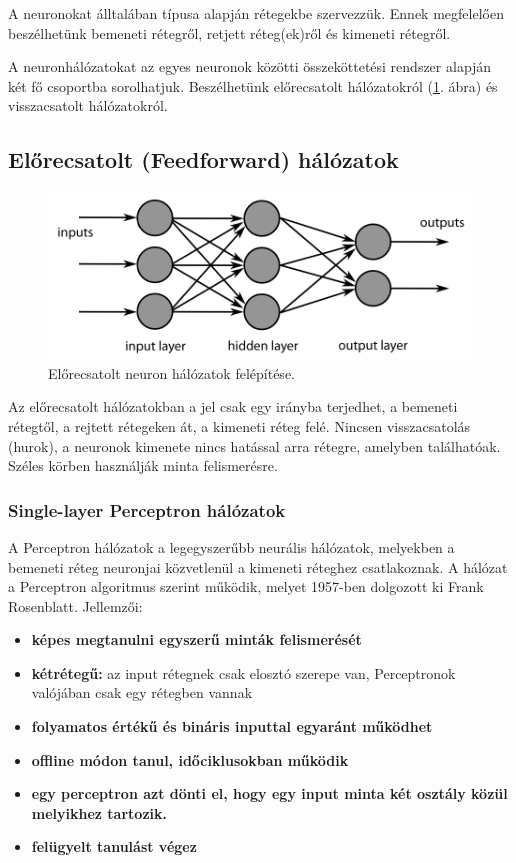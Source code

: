 \documentclass[a4paper]{article}
\begin{document}
A neuronokat álltalában típusa alapján rétegekbe szervezzük. Ennek megfelelően beszélhetünk bemeneti rétegről, retjett réteg(ek)ről és kimeneti rétegről.

A neuronhálózatokat az egyes neuronok közötti összeköttetési rendszer alapján két fő csoportba sorolhatjuk. Beszélhetünk előrecsatolt hálózatokról (\ref{forward_neuron}. ábra) és visszacsatolt hálózatokról. 

\subsection{Előrecsatolt (Feedforward) hálózatok}

\begin{figure}
  \centering
  \includegraphics[scale=0.3]{neuron_layers}
  \caption{Előrecsatolt neuron hálózatok felépítése.}
  \label{forward_neuron}
\end{figure}

Az előrecsatolt hálózatokban a jel csak egy irányba terjedhet, a bemeneti rétegtől, a rejtett rétegeken át,  a kimeneti réteg felé. Nincsen visszacsatolás (hurok), a neuronok kimenete nincs hatással arra rétegre, amelyben találhatóak. Széles körben használják minta felismerésre.

\subsubsection{Single-layer Perceptron hálózatok}
A Perceptron hálózatok a legegyszerűbb neurális hálózatok, melyekben a bemeneti réteg neuronjai közvetlenül a kimeneti réteghez csatlakoznak. A hálózat a Perceptron algoritmus szerint működik, melyet 1957-ben dolgozott ki Frank Rosenblatt. Jellemzői:
\begin{itemize}
    \item\textbf{képes megtanulni egyszerű minták felismerését} 
    \item\textbf{kétrétegű:} az input rétegnek csak elosztó szerepe van, Perceptronok valójában csak egy rétegben vannak
    \item\textbf{folyamatos értékű és bináris inputtal egyaránt működhet}
    \item\textbf{offline módon tanul, időciklusokban működik}
    \item\textbf{egy perceptron azt dönti el, hogy egy input minta két osztály közül melyikhez tartozik.}
    \item\textbf{felügyelt tanulást végez}
\end{itemize}
\end{document}
